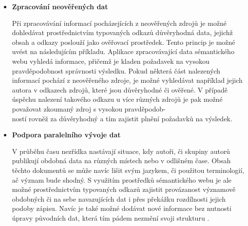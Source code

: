 \documentclass{projekt}
\begin{document}
\begin {itemize}
\item \textbf{Zpracování neověřených dat}

\hspace{0.65cm}Při zpracovávání informací pocházejících z neověřených zdrojů je možné dohledávat prostřednictvím typovaných odkazů důvěryhodná data, jejichž obsah a odkazy poslouží jako ověřovací prostředek. Tento princip je možné uvést na následujícím příkladu. Aplikace zpracovávající data sémantického webu vyhledá informace, přičemž je kladen požadavek na vysokou pravděpodobnost správnosti výsledku. Pokud některá část nalezených informací pochází z neověřeného zdroje, je možné vyhledávat například jejich autora v odkazech zdrojů, které jsou důvěryhodné či ověřené. V případě úspěchu nalezení takového odkazu u více různých zdrojů je pak možné považovat zkoumaný zdroj s vysokou pravděpodob-\\ností rovněž za důvěryhodný a tím zajistit plnění požadavků na výsledek.

\item \textbf{Podpora paralelního vývoje dat}

\hspace{0.65cm}V průběhu času nezřídka nastávají situace, kdy autoři, či skupiny autorů publikují obdobná data na různých místech nebo v odlišném čase. Obsah těchto dokumentů se může navíc lišit svým jazykem, či použitou terminologií, ač význam bude shodný. S využitím prostředků sémantického webu je ale možné prostřednictvím typovaných odkazů zajistit provázanost významově obdobných či na sebe navazujících dat i přes překážku rozdílnosti jejich podoby zápisu. Navíc je také možné dodávat nové informace bez nutnosti úpravy původních dat, která tím pádem nezmění svoji strukturu \cite{_1}.

\end{itemize}
\end{document}

